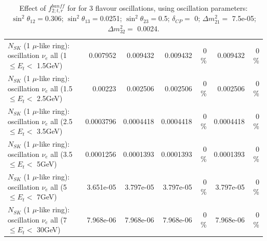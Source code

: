 \begin{table}
\begin{tabular}{| l | r | r | r  r | r  r |}
$N_{SK}$ (1 $\mu$-like ring): oscillation $\nu_{e}$ all (1 $\leq E_{t} <$ 1.5GeV) &        0.007952 &        0.009432 &        0.009432 &        0 \%  &        0.009432 &        0 \%  \\ 
$N_{SK}$ (1 $\mu$-like ring): oscillation $\nu_{e}$ all (1.5 $\leq E_{t} <$ 2.5GeV) &         0.00223 &        0.002506 &        0.002506 &        0 \%  &        0.002506 &        0 \%  \\ 
$N_{SK}$ (1 $\mu$-like ring): oscillation $\nu_{e}$ all (2.5 $\leq E_{t} <$ 3.5GeV) &       0.0003796 &       0.0004418 &       0.0004418 &        0 \%  &       0.0004418 &        0 \%  \\ 
$N_{SK}$ (1 $\mu$-like ring): oscillation $\nu_{e}$ all (3.5 $\leq E_{t} <$ 5GeV) &       0.0001256 &       0.0001393 &       0.0001393 &        0 \%  &       0.0001393 &        0 \%  \\ 
 $N_{SK}$ (1 $\mu$-like ring): oscillation $\nu_{e}$ all (5 $\leq E_{t} <$ 7GeV) &       3.651e-05 &       3.797e-05 &       3.797e-05 &        0 \%  &       3.797e-05 &        0 \%  \\ 
$N_{SK}$ (1 $\mu$-like ring): oscillation $\nu_{e}$ all (7 $\leq E_{t} <$ 30GeV) &       7.968e-06 &       7.968e-06 &       7.968e-06 &        0 \%  &       7.968e-06 &        0 \%  \\ 
\hline
\hline
\end{tabular}
\caption{ Effect of $f_{2; t, r}^{banff}$ for for 3 flavour oscillations, using oscillation parameters:  $\sin^2\theta_{12} = $0.306; $\sin^2\theta_{13} = $0.0251; $\sin^2\theta_{23} = $0.5; $\delta_{CP} = $        0; $\Delta m^2_{21} = $    7.5e-05; $\Delta m^2_{32} = $    0.0024. }
\label{tab:num_banff_02_1RmuT_3f_osc_t13:0.0251}
\end{table}
\clearpage
